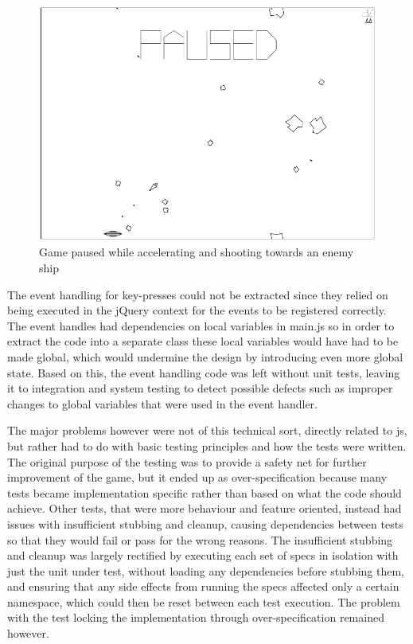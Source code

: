 \documentclass[11pt]{article}
\begin{document}
\begin{figure}[ht!]
\centering
\includegraphics[width=1.0\textwidth]{pics/game10.png}
\caption{Game paused while accelerating and shooting towards an enemy ship}
\label{fig:game10}
\end{figure}

The event handling for key-presses could not be extracted since they relied on being executed in the jQuery context for the events to be registered correctly. The event handles had dependencies on local variables in main.js so in order to extract the code into a separate class these local variables would have had to be made global, which would undermine the design by introducing even more global state. Based on this, the event handling code was left without unit tests, leaving it to integration and system testing to detect possible defects such as improper changes to global variables that were used in the event handler.

The major problems however were not of this technical sort, directly related to \gls{js}, but rather had to do with basic testing principles and how the tests were written. The original purpose of the testing was to provide a safety net for further improvement of the game, but it ended up as over-specification because many tests became implementation specific rather than based on what the code should achieve. Other tests, that were more behaviour and feature oriented, instead had issues with insufficient stubbing and cleanup, causing dependencies between tests so that they would fail or pass for the wrong reasons. The insufficient stubbing and cleanup was largely rectified by executing each set of specs in isolation with just the unit under test, without loading any dependencies before stubbing them, and ensuring that any side effects from running the specs affected only a certain namespace, which could then be reset between each test execution. The problem with the test locking the implementation through over-specification remained however.
\end{document}
